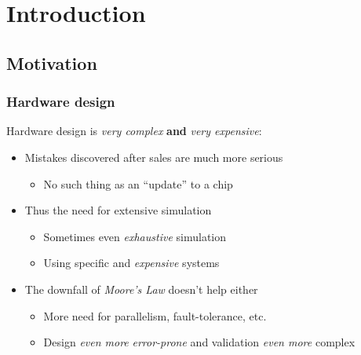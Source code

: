 \section{Introduction}
\label{sec:introduction}
    \frame{\sectionpage}

    \subsection{Motivation}
    \label{subsec:motivation}
        \begin{frame}
            \frametitle{Hardware design}

            \par{Hardware design is \emph{very complex} \textbf{and} \emph{very expensive}:}

            \begin{itemize}
                \item Mistakes discovered after sales are much more serious
                    \begin{itemize}
                        \item No such thing as an ``update'' to a chip
                    \end{itemize}
                \item Thus the need for extensive simulation
                    \begin{itemize}
                        \item Sometimes even \emph{exhaustive} simulation
                        \item Using specific and \emph{expensive} systems
                    \end{itemize}
                \item The downfall of \emph{Moore's Law} doesn't help either
                    \begin{itemize}
                        \item More need for parallelism, fault-tolerance, etc.
                        \item Design \emph{even more} \emph{error-prone} and validation \emph{even more} complex
                    \end{itemize}
            \end{itemize}
        \end{frame}

